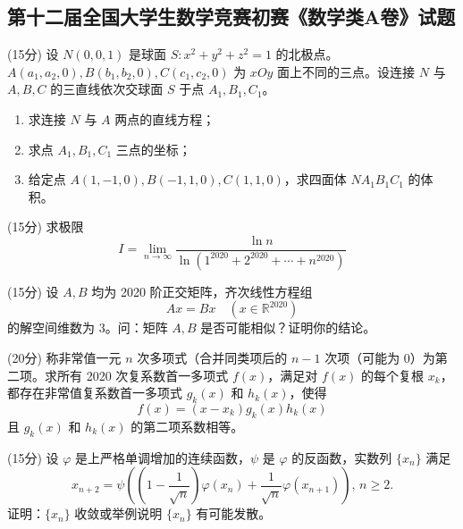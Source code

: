 \documentclass[loose]{ExBook}
\begin{document}
\subsection{第十二届全国大学生数学竞赛初赛《数学类A卷》试题}
\begin{qitems}
    \begin{bbox}
        \qitem (15分) 设 \( N(0,0,1) \) 是球面 \( S: x^2 + y^2 + z^2 = 1 \) 的北极点。\( A(a_1,a_2,0),B(b_1,b_2,0),C(c_1,c_2,0) \) 为 \( xOy \) 面上不同的三点。设连接 \( N \) 与 \( A,B,C \) 的三直线依次交球面 \( S \) 于点 \( A_1, B_1, C_1 \)。

        \begin{enumerate}[label=(\arabic*)]
            \item 求连接 \( N \) 与 \( A \) 两点的直线方程；
            \item 求点 \( A_1, B_1, C_1 \) 三点的坐标；
            \item 给定点 \( A(1,-1,0),B(-1,1,0),C(1,1,0) \)，求四面体 \( NA_1B_1C_1 \) 的体积。
        \end{enumerate}
    \end{bbox}

    \begin{bbox}
        \qitem (15分) 求极限
        \[I = \lim\limits_{n \to \infty} \frac{\ln n}{\ln \left( 1^{2020} + 2^{2020} + \cdots + n^{2020} \right)}\]
    \end{bbox}

    \begin{bbox}
        \qitem (15分) 设 \( A,B \) 均为 2020 阶正交矩阵，齐次线性方程组
        \[Ax = Bx \quad (x \in \mathbb{R}^{2020})\]
        的解空间维数为 3。问：矩阵 \( A,B \) 是否可能相似？证明你的结论。
    \end{bbox}

    \begin{bbox}
        \qitem (20分) 称非常值一元 \( n \) 次多项式（合并同类项后的 \( n-1 \) 次项（可能为 0）为第二项。求所有 2020 次复系数首一多项式 \( f(x) \)，满足对 \( f(x) \) 的每个复根 \( x_k \)，都存在非常值复系数首一多项式 \( g_k(x) \) 和 \( h_k(x) \)，使得
        \[f(x) = (x - x_k)g_k(x)h_k(x)\]
        且 \( g_k(x) \) 和 \( h_k(x) \) 的第二项系数相等。
    \end{bbox}

    \begin{bbox}
        \qitem (15分) 设 \( \varphi \) 是上严格单调增加的连续函数，\( \psi \) 是 \( \varphi \) 的反函数，实数列 \(\{x_n\}\) 满足
        \[x_{n+2} = \psi \left( \left( 1 - \frac{1}{\sqrt{n}} \right) \varphi \left( x_n \right) + \frac{1}{\sqrt{n}} \varphi \left( x_{n+1} \right) \right), \, n \geq 2.\]
        证明：\(\{x_n\}\) 收敛或举例说明 \(\{x_n\}\) 有可能发散。
    \end{bbox}


\end{qitems}
\end{document}
